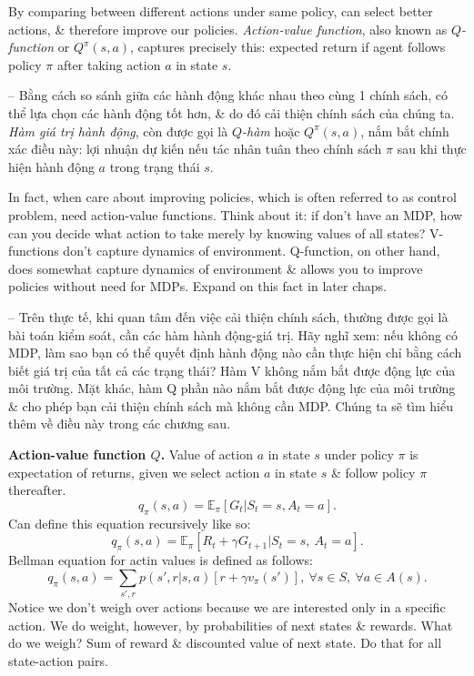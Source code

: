 \documentclass{article}
\begin{document}
\begin{itemize}
\begin{itemize}
\begin{itemize}
            By comparing between different actions under same policy, can select better actions, \& therefore improve our policies. {\it Action-value function}, also known as {\it$Q$-function} or $Q^\pi(s,a)$, captures precisely this: expected return if agent follows policy $\pi$ after taking action $a$ in state $s$.

            -- Bằng cách so sánh giữa các hành động khác nhau theo cùng 1 chính sách, có thể lựa chọn các hành động tốt hơn, \& do đó cải thiện chính sách của chúng ta. {\it Hàm giá trị hành động}, còn được gọi là {\it$Q$-hàm} hoặc $Q^\pi(s,a)$, nắm bắt chính xác điều này: lợi nhuận dự kiến nếu tác nhân tuân theo chính sách $\pi$ sau khi thực hiện hành động $a$ trong trạng thái $s$.

            In fact, when care about improving policies, which is often referred to as control problem, need action-value functions. Think about it: if don't have an MDP, how can you decide what action to take merely by knowing values of all states? V-functions don't capture dynamics of environment. Q-function, on other hand, does somewhat capture dynamics of environment \& allows you to improve policies without need for MDPs. Expand on this fact in later chaps.

            -- Trên thực tế, khi quan tâm đến việc cải thiện chính sách, thường được gọi là bài toán kiểm soát, cần các hàm hành động-giá trị. Hãy nghĩ xem: nếu không có MDP, làm sao bạn có thể quyết định hành động nào cần thực hiện chỉ bằng cách biết giá trị của tất cả các trạng thái? Hàm V không nắm bắt được động lực của môi trường. Mặt khác, hàm Q phần nào nắm bắt được động lực của môi trường \& cho phép bạn cải thiện chính sách mà không cần MDP. Chúng ta sẽ tìm hiểu thêm về điều này trong các chương sau.

            {\bf Action-value function $Q$.} Value of action $a$ in state $s$ under policy $\pi$ is expectation of returns, given we select action $a$ in state $s$ \& follow policy $\pi$ thereafter.
            \begin{equation*}
                q_\pi(s,a) = \mathbb{E}_\pi[G_t|S_t = s,A_t = a].
            \end{equation*}
            Can define this equation recursively like so:
            \begin{equation*}
                q_\pi(s,a) = \mathbb{E}_\pi[R_t + \gamma G_{t+1}|S_t = s,\ A_t = a].
            \end{equation*}
            Bellman equation for actin values is defined as follows:
            \begin{equation*}
                q_\pi(s,a) = \sum_{s',r} p(s',r|s,a)[r + \gamma v_\pi(s')],\ \forall s\in S,\ \forall a\in A(s).
            \end{equation*}
            Notice we don't weigh over actions because we are interested only in a specific action. We do weight, however, by probabilities of next states \& rewards. What do we weigh? Sum of reward \& discounted value of next state. Do that for all state-action pairs.


\end{itemize}
\end{itemize}
\end{itemize}
\end{document}
